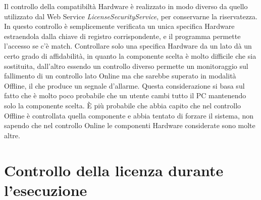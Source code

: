Il controllo della compatibiltà Hardware è realizzato in modo diverso da quello utilizzato dal Web Service \textit{LicenseSecurityService}, per conservarne la riservatezza. In questo controllo è semplicemente verificata un unica specifica Hardware estraendola dalla chiave di registro corrispondente, e il programma permette l'accesso se c'è match. Controllare solo una specifica Hardware da un lato dà un certo grado di affidabilità, in quanto la componente scelta è molto difficile che sia sostituita, dall'altro essendo un controllo diverso permette un monitoraggio sul fallimento di un controllo lato Online ma che sarebbe superato in modalità Offline, il che produce un segnale d'allarme. Questa considerazione si basa sul fatto che è molto poco probabile che un utente cambi tutto il PC mantenendo solo la componente scelta. È più probabile che abbia capito che nel controllo Offline è controllata quella componente e abbia tentato di forzare il sistema, non sapendo che nel controllo Online le componenti Hardware considerate sono molte altre.


\section{Controllo della licenza durante l'esecuzione}
\label{uniqueid}

